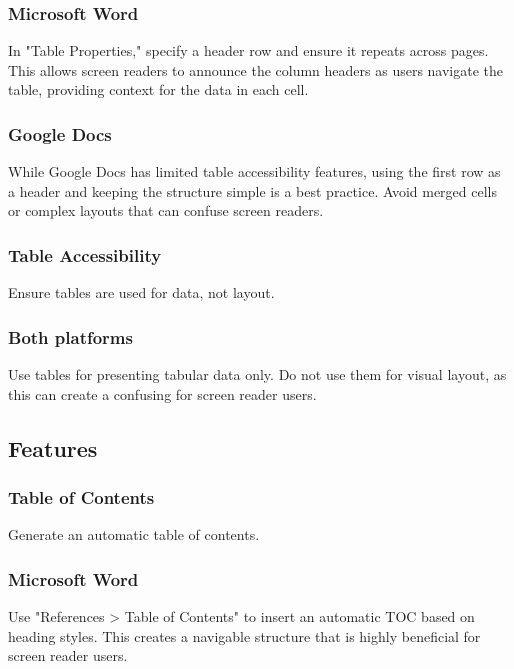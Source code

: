 \subsubsection{Microsoft Word}\label{ch15:sssec:word-tables}
In "Table Properties," specify a header row and ensure it repeats across pages. This allows screen readers to announce the column headers as users navigate the table, providing context for the data in each cell.

\subsubsection{Google Docs}\label{ch15:sssec:docs-tables}
While Google Docs has limited table accessibility features, using the first row as a header and keeping the structure simple is a best practice. Avoid merged cells or complex layouts that can confuse screen readers.

\subsubsection{Table Accessibility}\label{ch15:sssec:table-accessibility}
Ensure tables are used for data, not layout.

\subsubsection{Both platforms}\label{ch15:sssec:tables-both}
Use tables for presenting tabular data only. Do not use them for visual layout, as this can create a confusing  for screen reader users.

\subsection{ Features}\label{ch15:ssec:nav-features}

\subsubsection{Table of Contents}\label{ch15:sssec:toc}
Generate an automatic table of contents.

\subsubsection{Microsoft Word}\label{ch15:sssec:word-toc}
Use "References > Table of Contents" to insert an automatic TOC based on heading styles. This creates a navigable structure that is highly beneficial for screen reader users.

